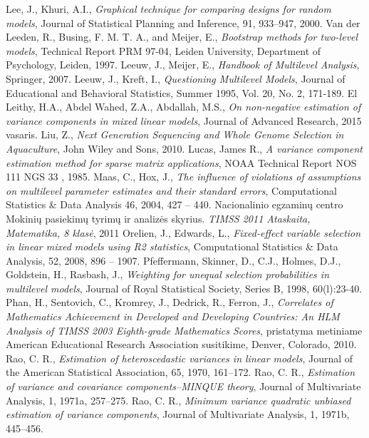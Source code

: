 \documentclass[12pt,a4paper]{article}
\begin{document}
\begin{thebibliography}{1}
Lee, J., Khuri, A.I., \textit{Graphical technique for comparing designs for random models}, Journal of Statistical Planning and Inference, 91,  933–947, 2000.
 Van der Leeden, R., Busing, F. M. T. A., and Meijer, E., \textit{Bootstrap methods for two-level models}, Technical Report PRM 97-04, Leiden University, Department of Psychology, Leiden, 1997.
 Leeuw, J., Meijer, E., \textit{Handbook of Multilevel Analysis}, Springer, 2007.
 Leeuw, J., Kreft, I., \textit{Questioning Multilevel Models}, Journal of Educational and Behavioral Statistics, Summer 1995, Vol. 20, No. 2, 171-189.
 El  Leithy,  H.A.,  Abdel  Wahed,  Z.A.,  Abdallah,  M.S.,  \textit{On  non-negative  estimation  of
variance components in mixed linear models}, Journal of Advanced Research, 2015 vasaris.
 Liu, Z., \textit{Next Generation Sequencing and Whole Genome Selection in Aquaculture}, John Wiley and Sons, 2010.
Lucas, James R., \textit{A variance component estimation method for sparse matrix applications}, NOAA Technical Report NOS 111 NGS 33 , 1985.
 Maas, C., Hox, J., \textit{The influence of violations of assumptions on multilevel parameter estimates and their standard errors}, Computational Statistics \& Data Analysis 46, 2004, 427 – 440.
 Nacionalinio egzaminų centro Mokinių pasiekimų tyrimų ir analizės skyrius. \textit{TIMSS 2011 Ataskaita, Matematika, 8 klasė}, 2011
 Orelien, J., Edwards, L., \textit{Fixed-effect variable selection in linear mixed models using R2 statistics}, Computational Statistics \& Data Analysis, 52, 2008, 896 – 1907.
 Pfeffermann, Skinner, D., C.J., Holmes, D.J., Goldstein, H., Rasbash, J., \textit{Weighting for unequal selection probabilities in multilevel models}, Journal of Royal Statistical Society, Series B, 1998, 60(l):23-40.
 Phan, H., Sentovich, C., Kromrey, J., Dedrick, R., Ferron, J., \textit{Correlates of Mathematics Achievement in Developed and Developing Countries: An HLM Analysis of TIMSS 2003 Eighth-grade Mathematics Scores}, pristatyma metiniame American Educational Research Association susitikime, Denver, Colorado, 2010.
Rao, C. R., \textit{Estimation of heteroscedastic variances in linear models}, Journal of the American Statistical Association, 65, 1970, 161–172.
 Rao, C. R., \textit{Estimation of variance and covariance components–MINQUE theory}, Journal of Multivariate Analysis, 1, 1971a, 257–275.
 Rao, C. R., \textit{Minimum variance quadratic unbiased estimation of variance components}, Journal of Multivariate Analysis, 1, 1971b, 445–456.

\end{thebibliography}
\end{document}
